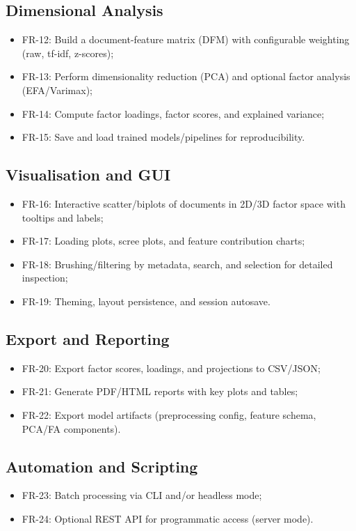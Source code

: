 \subsection{Dimensional Analysis}
\begin{itemize}
    \item FR-12: Build a document-feature matrix (DFM) with configurable weighting (raw, tf-idf, z-scores);
    \item FR-13: Perform dimensionality reduction (PCA) and optional factor analysis (EFA/Varimax);
    \item FR-14: Compute factor loadings, factor scores, and explained variance;
    \item FR-15: Save and load trained models/pipelines for reproducibility.
\end{itemize}

\subsection{Visualisation and GUI}
\begin{itemize}
    \item FR-16: Interactive scatter/biplots of documents in 2D/3D factor space with tooltips and labels;
    \item FR-17: Loading plots, scree plots, and feature contribution charts;
    \item FR-18: Brushing/filtering by metadata, search, and selection for detailed inspection;
    \item FR-19: Theming, layout persistence, and session autosave.
\end{itemize}

\subsection{Export and Reporting}
\begin{itemize}
    \item FR-20: Export factor scores, loadings, and projections to CSV/JSON;
    \item FR-21: Generate PDF/HTML reports with key plots and tables;
    \item FR-22: Export model artifacts (preprocessing config, feature schema, PCA/FA components).
\end{itemize}

\subsection{Automation and Scripting}
\begin{itemize}
    \item FR-23: Batch processing via CLI and/or headless mode;
    \item FR-24: Optional REST API for programmatic access (server mode).
\end{itemize}

